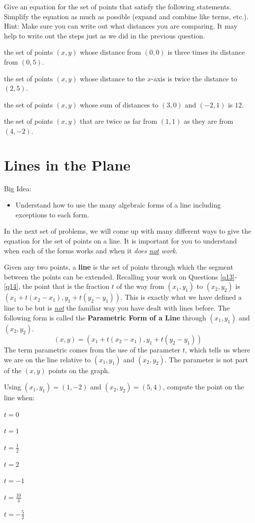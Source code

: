 \bq Give an equation for the set of points that satisfy the following statements. Simplify the equation as much as possible (expand and combine like terms, etc.). Hint: Make sure you can write out what distances you are comparing. It may help to write out the steps just as we did in the previous question.
\be
\item the set of points $(x,y)$ whose distance from $(0,0)$ is three times its distance from $(0,5)$.
\item the set of points $(x,y)$ whose distance to the $x$-axis is twice the distance to $(2,5)$.
\item the set of points $(x,y)$ whose sum of distances to $(3,0)$ and $(-2,1)$ is $12$.
\item the set of points $(x,y)$ that are twice as far from $(1,1)$ as they are from $(4,-2)$.
\ee
\eq

\section{Lines in the Plane}
Big Idea:
\begin{itemize}
\item Understand how to use the many algebraic forms of a line including exceptions to each form.
\end{itemize}
In the next set of problems, we will come up with many different ways to give the equation for the set of points on a line. It is important for you to understand when each of the forms works and when it \emph{does \underline{not} work}.
\begin{info} Given any two points, a \textbf{line} is the set of points through which the segment between the points can be extended.
Recalling your work on Questions \ref{q13}-\ref{q14}, the point that is the fraction $t$ of the way from $(x_1,y_1)$ to $(x_2,y_2)$ is $(x_1+t(x_2-x_1),y_1+t(y_2-y_1))$. This is exactly what we have defined a line to be but is \emph{\underline{not}} the familiar way you have dealt with lines before. The following form is called the \textbf{Parametric Form of a Line} through $(x_1,y_1)$ and $(x_2,y_2)$. $$(x,y)=(x_1+t(x_2-x_1),y_1+t(y_2-y_1))$$
The term parametric comes from the use of the parameter $t$, which tells us where we are on the line relative to $(x_1,y_1)$ and $(x_2,y_2)$. The parameter is not part of the $(x,y)$ points on the graph.
\end{info}

\bq\label{qp} Using $(x_1,y_1)=(1,-2)$ and $(x_2,y_2) = (5,4)$, compute the point on the line when:
\be
\item $t=0$
\item $t=1$
\item $t=\frac{1}{2}$
\item $t=2$
\item $t=-1$
\item $t=\frac{10}{3}$
\item $t=-\frac{5}{2}$
\ee
\eq

